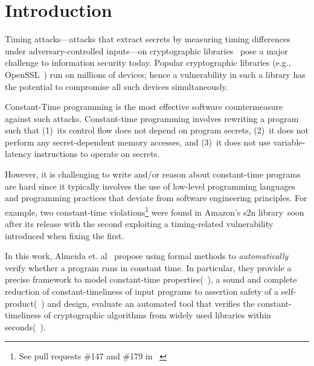 \section{Introduction}

Timing attacks---attacks that extract secrets by measuring timing differences under adversary-controlled inputs---on cryptographic libraries~\cite{bernstein_cache_timing_attacks, dsa_exponentiations} pose a major challenge to information security today. 
Popular cryptographic libraries (e.g., OpenSSL~\cite{openssl}) run on millions of devices; hence a vulnerability in such a library has the potential to compromise all such devices simultaneously.

Constant-Time programming is the most effective software countermeasure against such attacks.
Constant-time programming involves rewriting a program such that (1)~its control flow does not depend on program secrets, (2)~it does not perform any secret-dependent memory accesses, and (3)~it does not use variable-latency instructions to operate on secrets.

However, it is challenging to write and/or reason about constant-time programs are hard since it typically involves the use of low-level programming languages and programming practices that deviate from software engineering principles.
For example, two constant-time violations\footnote{See pull requests \#147 and \#179 in ~\cite{s2n}} were found in Amazon's s2n library~\cite{s2n}soon after its release with the second exploiting a timing-related vulnerability introduced when fixing the first.

In this work, Almeida et. al~\cite{almeida} propose using formal methods to \emph{automatically} verify whether a program runs in constant time. 
In particular, they provide a precise framework to model constant-time properties(~), a sound and complete reduction of constant-timeliness of input programs to assertion safety of a self-product(~) and design, evaluate an automated tool that verifies the constant-timeliness of cryptographic algorithms from widely used libraries within seconds(~). 
